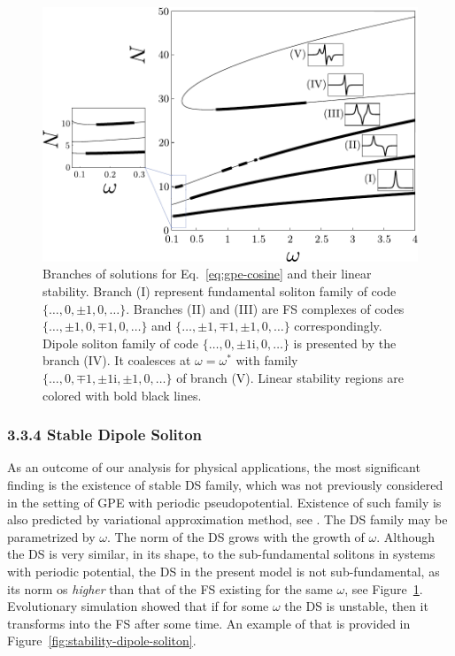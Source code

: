 \begin{figure}[h]
\centering
	\includegraphics[scale = 1]{pic/branches for cosine equation}
	\caption{
		Branches of solutions for Eq.~\eqref{eq:gpe-cosine} and their linear stability.
		Branch (I) represent fundamental soliton family of code $\{ \dots, 0, \pm 1, 0, \dots \}$.
		Branches (II) and (III) are FS complexes of codes $\{ \dots, \pm 1, 0, \mp 1, 0, \dots \}$ and $\{ \dots, \pm 1, \mp 1, \pm 1, 0, \dots \}$ correspondingly.
		Dipole soliton family of code $\{ \dots, 0, \pm 1\mathrm{i}, 0, \dots \}$ is presented by the branch (IV).
		It coalesces at $\omega = \omega^*$ with family $\{ \dots, 0, \mp 1, \pm 1\mathrm{i}, \pm 1, 0, \dots \}$ of branch (V).
		Linear stability regions are colored with bold black lines.
	}
\label{fig:branches-with-stability}
\end{figure}

\subsubsection*{3.3.4 Stable Dipole Soliton}

As an outcome of our analysis for physical applications, the most significant finding is the existence of stable DS family, which was not previously considered in the setting of GPE with periodic pseudopotential.
Existence of such family is also predicted by variational approximation method, see \cite{LebedevAlfimovMalomed}.
The DS family may be parametrized by $\omega$.
The norm of the DS grows with the growth of $\omega$.
Although the DS is very similar, in its shape, to the sub-fundamental solitons in systems with periodic potential, the DS in the present model is not sub-fundamental, as its norm os {\it higher} than that of the FS existing for the same $\omega$, see Figure~\ref{fig:branches-with-stability}.
Evolutionary simulation showed that if for some $\omega$ the DS is unstable, then it transforms into the FS after some time.
An example of that is provided in Figure~\ref{fig:stability-dipole-soliton}.

